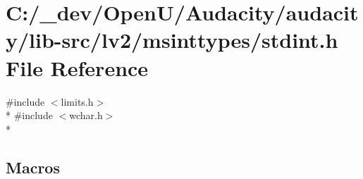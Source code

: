 \hypertarget{lib-src_2lv2_2msinttypes_2stdint_8h}{}\section{C\+:/\+\_\+dev/\+Open\+U/\+Audacity/audacity/lib-\/src/lv2/msinttypes/stdint.h File Reference}
\label{lib-src_2lv2_2msinttypes_2stdint_8h}
{\ttfamily \#include $<$limits.\+h$>$}\\*
{\ttfamily \#include $<$wchar.\+h$>$}\\*
\subsection*{Macros}
